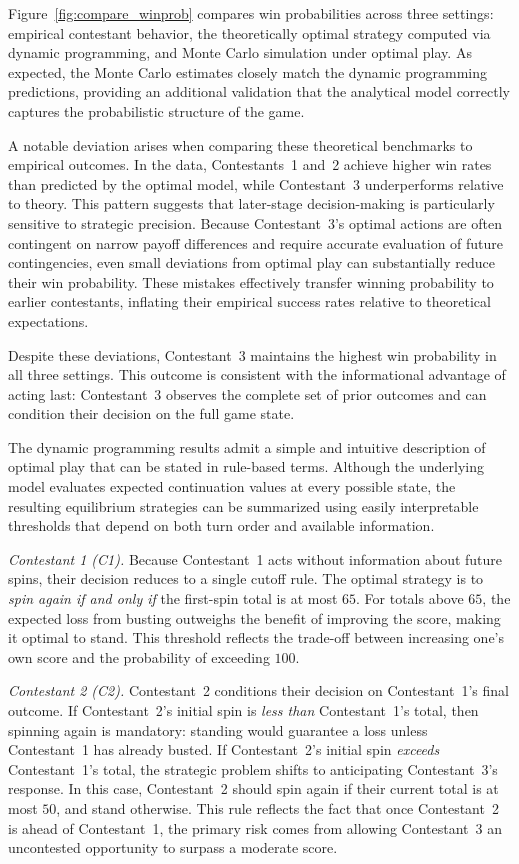 \documentclass[titlepage,12pt]{article}
\begin{document}
Figure~\ref{fig:compare_winprob} compares win probabilities across three settings: empirical contestant behavior, the theoretically optimal strategy computed via dynamic programming, and Monte Carlo simulation under optimal play. As expected, the Monte Carlo estimates closely match the dynamic programming predictions, providing an additional validation that the analytical model correctly captures the probabilistic structure of the game.

A notable deviation arises when comparing these theoretical benchmarks to empirical outcomes. In the data, Contestants~1 and~2 achieve higher win rates than predicted by the optimal model, while Contestant~3 underperforms relative to theory. This pattern suggests that later-stage decision-making is particularly sensitive to strategic precision. Because Contestant~3’s optimal actions are often contingent on narrow payoff differences and require accurate evaluation of future contingencies, even small deviations from optimal play can substantially reduce their win probability. These mistakes effectively transfer winning probability to earlier contestants, inflating their empirical success rates relative to theoretical expectations.

Despite these deviations, Contestant~3 maintains the highest win probability in all three settings. This outcome is consistent with the informational advantage of acting last: Contestant~3 observes the complete set of prior outcomes and can condition their decision on the full game state. 

The dynamic programming results admit a simple and intuitive description of optimal play that can be stated in rule-based terms. Although the underlying model evaluates expected continuation values at every possible state, the resulting equilibrium strategies can be summarized using easily interpretable thresholds that depend on both turn order and available information.

\emph{Contestant 1 (C1).}
Because Contestant~1 acts without information about future spins, their decision reduces to a single cutoff rule. The optimal strategy is to \emph{spin again if and only if} the first-spin total is at most $65$. For totals above $65$, the expected loss from busting outweighs the benefit of improving the score, making it optimal to stand. This threshold reflects the trade-off between increasing one’s own score and the probability of exceeding $100$.

\emph{Contestant 2 (C2).}
Contestant~2 conditions their decision on Contestant~1’s final outcome. If Contestant~2’s initial spin is \emph{less than} Contestant~1’s total, then spinning again is mandatory: standing would guarantee a loss unless Contestant~1 has already busted. If Contestant~2’s initial spin \emph{exceeds} Contestant~1’s total, the strategic problem shifts to anticipating Contestant~3’s response. In this case, Contestant~2 should spin again if their current total is at most $50$, and stand otherwise. This rule reflects the fact that once Contestant~2 is ahead of Contestant~1, the primary risk comes from allowing Contestant~3 an uncontested opportunity to surpass a moderate score.
\end{document}
